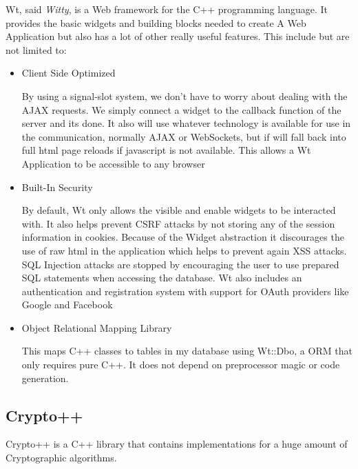 Wt, said \textit{Witty}, is a Web framework for the C++ programming language. It provides the basic widgets and building blocks needed to create A Web Application but also has a lot of other really useful features. This include but are not limited to:

\begin{itemize}
\item{Client Side Optimized

By using a signal-slot system, we don't have to worry about dealing with the AJAX requests. We simply connect a widget to the callback function of the server and its done. It also will use whatever technology is available for use in the communication, normally AJAX or WebSockets, but if will fall back into full html page reloads if javascript is not available. This allows a Wt Application to be accessible to any browser}
\item{Built-In Security

By default, Wt only allows the visible and enable widgets to be interacted with. It also helps prevent CSRF attacks by not storing any of the session information in cookies. Because of the Widget abstraction it discourages the use of raw html in the application which helps to prevent again XSS attacks. SQL Injection attacks are stopped by encouraging the user to use prepared SQL statements when accessing the database. Wt also includes an authentication and registration system with support for OAuth providers like Google and Facebook}
\item{Object Relational Mapping Library

This maps C++ classes to tables in my database using Wt::Dbo, a ORM that only requires pure C++. It does not depend on preprocessor magic or code generation.}
\end{itemize}

\subsection{Crypto++}

Crypto++ is a C++ library that contains implementations for a huge amount of Cryptographic algorithms.


